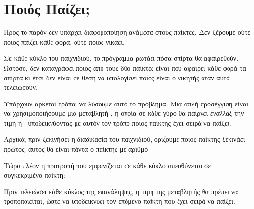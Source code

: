 \documentclass[a4paper,11pt,oneside]{book}
\begin{document}

\section{Ποιός Παίζει;}

\begin{question}
Προς το παρόν δεν υπάρχει διαφοροποίηση ανάμεσα στους παίκτες. Δεν ξέρουμε ούτε ποιος παίζει κάθε φορά, ούτε ποιος νικάει.
\end{question}

Σε κάθε κύκλο του παιχνιδιού, το πρόγραμμα ρωτάει πόσα σπίρτα θα αφαιρεθούν. Ωστόσο, δεν καταγράφει ποιος από τους δύο παίκτες είναι που αφαιρεί κάθε φορά τα σπίρτα κι έτσι δεν είναι σε θέση να υπολογίσει ποιος είναι ο νικητής όταν αυτά τελειώσουν.

\clearpage
{}
Υπάρχουν αρκετοί τρόποι να λύσουμε αυτό το πρόβλημα. Μια απλή προσέγγιση είναι να χρησιμοποιήσουμε μια μεταβλητή , η οποία σε κάθε γύρο θα παίρνει \emph{εναλλάξ} την τιμή  ή , υποδεικνύοντας με αυτόν τον τρόπο ποιος παίκτης έχει σειρά να παίξει.

Αρχικά, πριν ξεκινήσει η διαδικασία του παιχνιδιού, ορίζουμε ποιος παίκτης ξεκινάει πρώτος: αυτός θα είναι πάντα ο παίκτης με αριθμό~.


Τώρα πλέον η προτροπή που εμφανίζεται σε κάθε κύκλο απευθύνεται σε συγκεκριμένο παίκτη:


Πριν τελειώσει κάθε κύκλος της επανάληψης, η τιμή της μεταβλητής  θα πρέπει να τροποποιείται, ώστε να υποδεικνύει τον επόμενο παίκτη που έχει σειρά να παίξει. 
\end{document}

